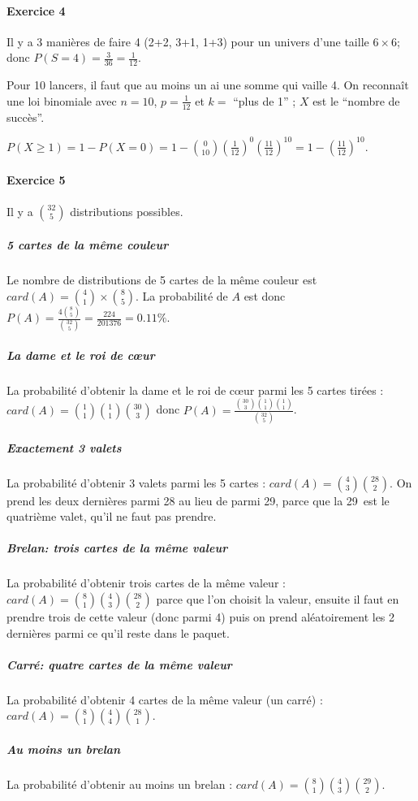 \documentclass[10pt,a4paper,french]{article}
\begin{document}
\paragraph{Exercice 4}
Il y a 3 manières de faire 4 (2+2, 3+1, 1+3) pour un univers d'une taille $6\times6$; donc $P(S=4)=\frac{3}{36}=\frac{1}{12}$.

Pour 10 lancers, il faut que au moins un ai une somme qui vaille 4. On reconnaît une loi binomiale avec $n=10$, $p=\frac{1}{12}$ et $k=$ ``plus de 1'' ; $X$ est le ``nombre de succès''.

$P(X \geq 1) = 1 - P(X=0) = 1 - {0 \choose 10} (\frac{1}{12})^0 (\frac{11}{12})^{10} = 1 - (\frac{11}{12})^{10}$.

\paragraph{Exercice 5}
Il y a $32 \choose 5$ distributions possibles.

\subparagraph{5 cartes de la même couleur}
Le nombre de distributions de 5 cartes de la même couleur est $card(A)={4 \choose 1}\times{8 \choose 5}$. La probabilité de $A$ est donc $P(A)=\frac{4 {8 \choose 5}}{{32 \choose 5}} = \frac{224}{201376}=0.11\%$.

\subparagraph{La dame et le roi de cœur}
La probabilité d'obtenir la dame et le roi de cœur parmi les 5 cartes tirées : $card(A)={1\choose 1}{1\choose 1}{30 \choose 3}$ donc $P(A)=\frac{{30 \choose 3}{1\choose 1}{1\choose 1}}{{32 \choose 5}}$.

\subparagraph{Exactement 3 valets}
La probabilité d'obtenir 3 valets parmi les 5 cartes : $card(A)={4 \choose 3}{28 \choose 2}$. On prend les deux dernières parmi 28 au lieu de parmi 29, parce que la 29\ieme~est le quatrième valet, qu'il ne faut pas prendre.

\subparagraph{Brelan: trois cartes de la même valeur}
La probabilité d'obtenir trois cartes de la même valeur : $card(A)={8 \choose 1} {4 \choose 3} {28 \choose 2}$ parce que l'on choisit la valeur, ensuite il faut en prendre trois de cette valeur (donc parmi 4) puis on prend aléatoirement les 2 dernières parmi ce qu'il reste dans le paquet.

\subparagraph{Carré: quatre cartes de la même valeur}
La probabilité d'obtenir 4 cartes de la même valeur (un carré) : $card(A)={8 \choose 1}{4 \choose 4}{28 \choose 1}$.

\subparagraph{Au moins un brelan}
La probabilité d'obtenir au moins un brelan : $card(A)={8 \choose 1}{4 \choose 3}{29 \choose 2}$.
\end{document}

